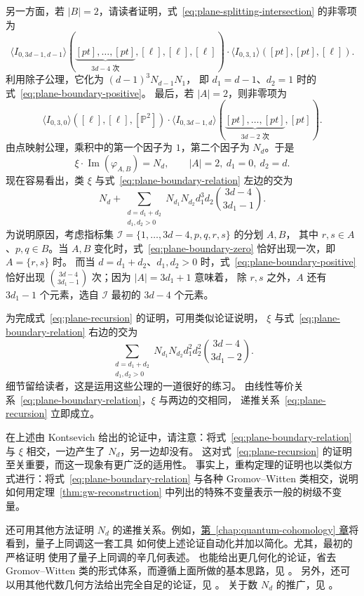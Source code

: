 另一方面，若 $|B|=2$，请读者证明，式~\eqref{eq:plane-splitting-intersection} 的非零项为
\[
\langle I_{0,3d-1,d-1}\rangle(\underbrace{[pt],\ldots,[pt]}_{3d-4\text{ 次}},[\ell],[\ell],[\ell])
\cdot\langle I_{0,3,1}\rangle([pt],[pt],[\ell]).
\]
利用除子公理，它化为 $(d-1)^3N_{d-1}N_1$，
即 $d_1=d-1$、$d_2=1$ 时的式~\eqref{eq:plane-boundary-positive}。
最后，若 $|A|=2$，则非零项为
\[
\langle I_{0,3,0}\rangle([\ell],[\ell],[\mathbb P^2])
\cdot\langle I_{0,3d-1,d}\rangle(\underbrace{[pt],\ldots,[pt]}_{3d-2\text{ 次}},[pt]).
\]
由点映射公理，乘积中的第一个因子为 $1$，第二个因子为 $N_d$。于是
\begin{equation}\label{eq:plane-boundary-zero}
\xi\cdot\operatorname{Im}(\varphi_{A,B})=N_d,\qquad |A|=2,\ d_1=0,\ d_2=d.
\end{equation}
现在容易看出，类 $\xi$ 与式~\eqref{eq:plane-boundary-relation} 左边的交为
\[
N_d+\sum_{\substack{d=d_1+d_2\\d_1,d_2>0}}N_{d_1}N_{d_2}d_1^3d_2\binom{3d-4}{3d_1-1}.
\]
为说明原因，考虑指标集 $\mathcal I=\{1,\ldots,3d-4,p,q,r,s\}$ 的分划 $A,B$，
其中 $r,s\in A$、$p,q\in B$。当 $A,B$ 变化时，式~\eqref{eq:plane-boundary-zero}
恰好出现一次，即 $A=\{r,s\}$ 时。
而当 $d=d_1+d_2$、$d_1,d_2>0$ 时，式~\eqref{eq:plane-boundary-positive}
恰好出现 $\binom{3d-4}{3d_1-1}$ 次；因为 $|A|=3d_1+1$ 意味着，
除 $r,s$ 之外，$A$ 还有 $3d_1-1$ 个元素，选自 $\mathcal I$ 最初的 $3d-4$ 个元素。

为完成式~\eqref{eq:plane-recursion} 的证明，可用类似论证说明，
$\xi$ 与式~\eqref{eq:plane-boundary-relation} 右边的交为
\[
\sum_{\substack{d=d_1+d_2\\d_1,d_2>0}}N_{d_1}N_{d_2}d_1^2d_2^2\binom{3d-4}{3d_1-2}.
\]
细节留给读者，这是运用这些公理的一道很好的练习。
由线性等价关系~\eqref{eq:plane-boundary-relation}，$\xi$ 与两边的交相同，
递推关系~\eqref{eq:plane-recursion} 立即成立。

在上述由 Kontsevich 给出的论证中，请注意：将式~\eqref{eq:plane-boundary-relation}
与 $\xi$ 相交，一边产生了 $N_d$，另一边却没有。
这对式~\eqref{eq:plane-recursion} 的证明至关重要，而这一现象有更广泛的适用性。
事实上，重构定理的证明也以类似方式进行：将式~\eqref{eq:plane-boundary-relation}
与各种 Gromov--Witten 类相交，说明如何用定理~\ref{thm:gw-reconstruction}
中列出的特殊不变量表示一般的树级不变量。

还可用其他方法证明 $N_d$ 的递推关系。例如，\hyperref[chap:quantum-cohomology]{第~\ref*{chap:quantum-cohomology} 章}将看到，量子上同调这一套工具
如何使上述论证自动化并加以简化。尤其，最初的严格证明 
使用了量子上同调的辛几何表述。
也能给出更几何化的论证，省去 Gromov--Witten 类的形式体系，而遵循上面所做的基本思路，见 。
另外，还可以用其他代数几何方法给出完全自足的论证，见 。
关于数 $N_d$ 的推广，见 。

